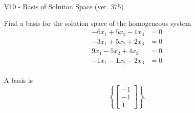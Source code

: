 \begin{exercise}
  \begin{exerciseTitle}V10 - Basis of Solution Space (ver. 375)\end{exerciseTitle}
  \begin{exerciseStatement}
    Find a basis for the solution space of the homogeneous system 
\begin{align*}
 -6 x_ 1 + 5 x_ 2 -1 x_ 3 &= 0  \\ 
  -3 x_ 1 + 5 x_ 2 + 2 x_ 3 &= 0  \\ 
  9 x_ 1 -5 x_ 2 + 4 x_ 3 &= 0  \\ 
  -1 x_ 1 -1 x_ 2 -2 x_ 3 &= 0  \\ 
 \end{align*}


 
  \end{exerciseStatement}

  \begin{exerciseAnswer}
   A basis is   
\[\left\{\left[\begin{array}{c}
-1 \\
-1 \\
1
\end{array}\right]\right\}.\]

  


  \end{exerciseAnswer}
\end{exercise}